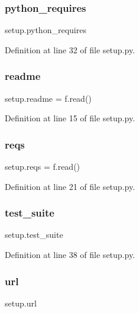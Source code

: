 \subsubsection{\texorpdfstring{python\+\_\+requires}{python\_requires}}
{\footnotesize\ttfamily setup.\+python\+\_\+requires}



Definition at line 32 of file setup.\+py.

\mbox{\label{namespacesetup_af307481f158da7b58a33229df5e30c6c}} 
\subsubsection{\texorpdfstring{readme}{readme}}
{\footnotesize\ttfamily setup.\+readme = f.\+read()}



Definition at line 15 of file setup.\+py.

\mbox{\label{namespacesetup_a0c29631fa586cf133cd55999a817f46b}} 
\subsubsection{\texorpdfstring{reqs}{reqs}}
{\footnotesize\ttfamily setup.\+reqs = f.\+read()}



Definition at line 21 of file setup.\+py.

\mbox{\label{namespacesetup_afd7a7f31bfa5027bfe335aedfcc1b70e}} 
\subsubsection{\texorpdfstring{test\+\_\+suite}{test\_suite}}
{\footnotesize\ttfamily setup.\+test\+\_\+suite}



Definition at line 38 of file setup.\+py.

\mbox{\label{namespacesetup_afc13124aa5c0124e84e1d965e3f4b0fb}} 
\subsubsection{\texorpdfstring{url}{url}}
{\footnotesize\ttfamily setup.\+url}



